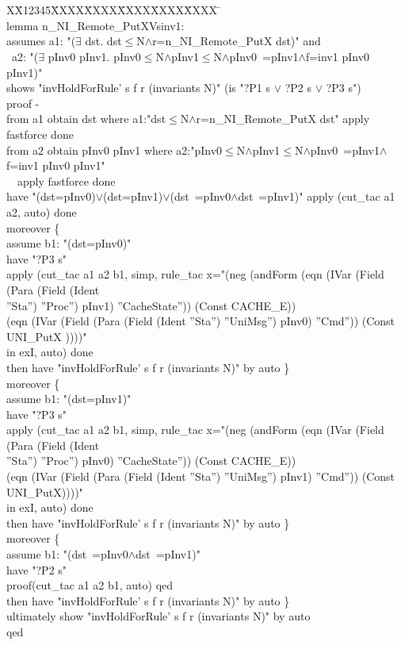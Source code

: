 \documentclass{llncs}
\newlength{\fminilength}
\newenvironment{fmini}[1][\linewidth]
  {\setlength{\fminilength}{#1\fboxsep-2\fboxrule}%
   \vspace{2ex}\noindent\begin{lrbox}{\fminibox}\begin{minipage}{\fminilength}%
   \mbox{ }\hfill\vspace{-2.5ex}}%
  {\end{minipage}\end{lrbox}\vspace{1ex}\hspace{0ex}%
   \framebox{\usebox{\fminibox}}}
\newenvironment{specification}
{\noindent\scriptsize
\tt\begin{fmini}\begin{tabbing}X\=X12345\=XXXX\=XXXX\=XXXX\=XXXX\=XXXX
\=\+\kill} {\end{tabbing}\normalfont\end{fmini}}
\def \twoSpaces {\ \ }
\def \twoSpaces {\ \ }
\begin{document}
\begin{specification}\\
lemma n\_NI\_Remote\_PutXVsinv1:\\
assumes a1: "($\exists$ dst. dst$\le$N$\wedge$r=n\_NI\_Remote\_PutX  dst)" and\\\
a2: "($\exists$ pInv0 pInv1. pInv0$\le$N$\wedge$pInv1$\le$N$\wedge$pInv0~=pInv1$\wedge$f=inv1  pInv0 pInv1)"\\
shows "invHoldForRule' s f r (invariants N)" (is "?P1 s $\vee$ ?P2 s $\vee$ ?P3 s")\\
proof -\\
from a1 obtain dst where a1:"dst$\le$N$\wedge$r=n\_NI\_Remote\_PutX  dst" apply fastforce done\\
from a2 obtain pInv0 pInv1 where a2:"pInv0$\le$N$\wedge$pInv1$\le$N$\wedge$pInv0~=pInv1$\wedge$f=inv1  pInv0 pInv1" \\
\twoSpaces apply fastforce done\\
have "(dst=pInv0)$\vee$(dst=pInv1)$\vee$(dst~=pInv0$\wedge$dst~=pInv1)" apply (cut\_tac a1 a2, auto) done\\
moreover \{\\
  assume b1: "(dst=pInv0)"\\
  have "?P3 s"\\
  apply (cut\_tac a1 a2 b1, simp, rule\_tac x="(neg (andForm (eqn (IVar (Field (Para (Field (Ident \\
  ''Sta'') ''Proc'') pInv1) ''CacheState'')) (Const CACHE\_E))\\
  (eqn (IVar (Field (Para (Field (Ident ''Sta'') ''UniMsg'') pInv0) ''Cmd'')) (Const UNI\_PutX  ))))"\\ in exI, auto) done\\
  then have "invHoldForRule' s f r (invariants N)" by auto
\}\\
moreover \{\\
  assume b1: "(dst=pInv1)"\\
  have "?P3 s"\\
  apply (cut\_tac a1 a2 b1, simp, rule\_tac x="(neg (andForm (eqn (IVar (Field (Para (Field (Ident\\
   ''Sta'') ''Proc'') pInv0) ''CacheState''))    (Const CACHE\_E)) \\
   (eqn (IVar (Field (Para (Field (Ident ''Sta'') ''UniMsg'') pInv1) ''Cmd'')) (Const UNI\_PutX))))" \\
   in exI, auto) done\\
  then have "invHoldForRule' s f r (invariants N)" by auto
\}\\
moreover \{\\
  assume b1: "(dst~=pInv0$\wedge$dst~=pInv1)"\\
  have "?P2 s"\\
  proof(cut\_tac a1 a2 b1, auto) qed\\
  then have "invHoldForRule' s f r (invariants N)" by auto
\}\\
ultimately show "invHoldForRule' s f r (invariants N)" by auto\\
qed\\
\end{specification}\\
\end{document}
